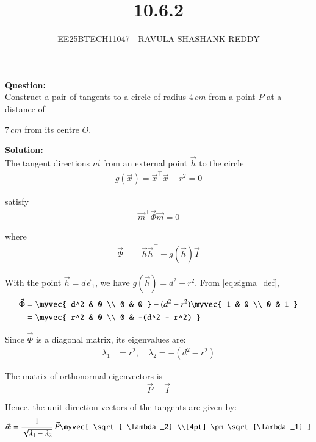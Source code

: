 \documentclass[journal]{article}
\begin{document}
	
	
	\vspace{3cm}
	
\title{10.6.2}
\author{EE25BTECH11047 - RAVULA SHASHANK REDDY}
\maketitle
\hrulefill
\bigskip 

\renewcommand{\thetable}{\theenumi}
\setlength{\intextsep}{10pt}

\textbf{Question:} \\

Construct a pair of tangents to a circle of radius \(4\,cm\) from a point \(P\) at a distance of 

\(7\,cm\) from its centre \(O\).

\textbf{Solution:}\\


The tangent directions \(\vec{m}\) from an external point \(\vec{h}\) to the circle 
\begin{align}
g(\vec{x}) = \vec{x}^\top \vec{x} - r^2 = 0
\end{align}

satisfy 
\begin{align}
\vec{m}^\top \vec{\Phi} \vec{m} = 0
\end{align}

where 
\begin{align}
\vec{\Phi} &= \vec{h}\vec{h}^\top - g(\vec{h})\vec{I} \label{eq:sigma_def}
\end{align}

With the point \(\vec{h} = d\vec{e}_1\), we have \(g(\vec{h}) = d^2 - r^2\). From \eqref{eq:sigma_def},
\begin{align}
\vec{\Phi} &= 
\myvec{
d^2 & 0 \\
0 & 0
}
-
(d^2 - r^2)
\myvec{
1 & 0 \\
0 & 1
}
\\
&=
\myvec{
r^2 & 0 \\
0 & -(d^2 - r^2)
} \label{eq:sigma_matrix}
\end{align}

Since \(\vec{\Phi}\) is a diagonal matrix, its eigenvalues are:
\begin{align}
\lambda_1 &= r^2, \quad \lambda_2 = -(d^2 - r^2) \label{eq:eigenvalues}
\end{align}

The matrix of orthonormal eigenvectors is 
\[
\vec{P} = \vec{I}
\]

Hence, the unit direction vectors of the tangents are given by:
\begin{align}
\vec{m} = \frac{1}{\sqrt{\lambda_1 - \lambda_2}} \, \vec{P} 
\myvec{
\sqrt{-\lambda_2} \\[4pt]
\pm \sqrt{\lambda_1}
}
\label{eq:m_general}
\end{align}
\end{document}
